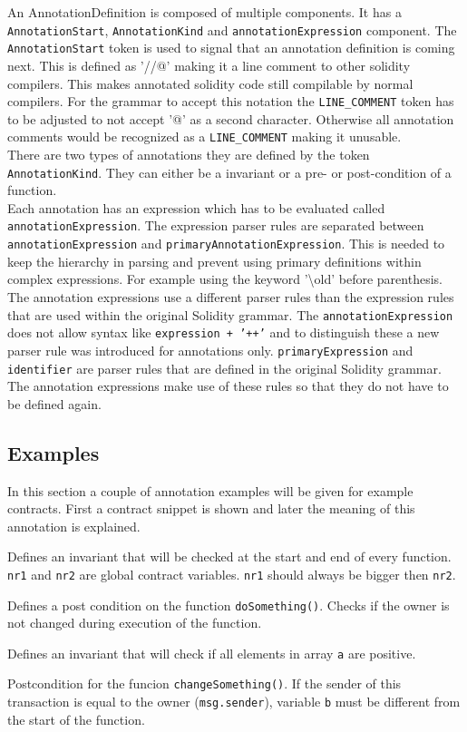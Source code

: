 \documentclass[a4paper]{article}
\begin{document}
An AnnotationDefinition is composed of multiple components. It has a \texttt{AnnotationStart}, \texttt{AnnotationKind} and \texttt{annotationExpression} component. The \texttt{AnnotationStart} token is used to signal that an annotation definition is coming next. This is defined as '//@' making it a line comment to other solidity compilers. This makes annotated solidity code still compilable by normal compilers. For the grammar to accept this notation the \texttt{LINE\_COMMENT} token has to be adjusted to not accept '@' as a second character. Otherwise all annotation comments would be recognized as a \texttt{LINE\_COMMENT} making it unusable. \\
There are two types of annotations they are defined by the token \texttt{AnnotationKind}. They can either be a invariant or a pre- or post-condition of a function. \\
Each annotation has an expression which has to be evaluated called \texttt{annotationExpression}. The expression parser rules are separated between \texttt{annotationExpression} and \texttt{primaryAnnotationExpression}. This is needed to keep the hierarchy in parsing and prevent using primary definitions within complex expressions. For example using the keyword '\textbackslash old' before parenthesis.\\
The annotation expressions use a different parser rules than the expression rules that are used within the original Solidity grammar. The \texttt{annotationExpression} does not allow syntax like \texttt{expression + '++'} and to distinguish these a new parser rule was introduced for annotations only. \texttt{primaryExpression} and \texttt{identifier} are parser rules that are defined in the original Solidity grammar. The annotation expressions make use of these rules so that they do not have to be defined again.

\subsection{Examples}
In this section a couple of annotation examples will be given for example contracts. First a contract snippet is shown and later the meaning of this annotation is explained.

Defines an invariant that will be checked at the start and end of every function. \texttt{nr1} and \texttt{nr2} are global contract variables. \texttt{nr1} should always be bigger then \texttt{nr2}.

Defines a post condition on the function \texttt{doSomething()}. Checks if the owner is not changed during execution of the function.

Defines an invariant that will check if all elements in array \texttt{a} are positive.

Postcondition for the funcion \texttt{changeSomething()}. If the sender of this transaction is equal to the owner (\texttt{msg.sender}), variable \texttt{b} must be different from the start of the function. 
\end{document}
